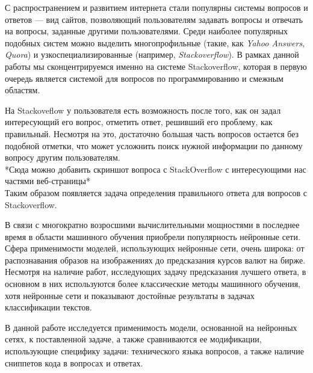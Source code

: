 \documentclass[../diploma.tex]{subfiles}
\begin{document}
        
    \label{sections/introduction}
    
    С распространением и развитием интернета стали популярны системы вопросов и ответов --- вид сайтов, 
    позволяющий пользователям задавать вопросы и отвечать на вопросы, заданные другими пользователями.
    Среди наиболее популярных подобных систем можно выделить многопрофильные (такие, как \textit{Yahoo Answers}, \textit{Quora}) 
    и узкоспециализированные (например, \textit{Stackoverflow}).
    В рамках данной работы мы сконцентрируемся именно на системе Stackoverflow, 
    которая в первую очередь является системой для вопросов по программированию и смежным областям.

    На Stackoveflow у пользователя есть возможность после того, как он задал интересующий его вопрос, отметить ответ, решивший его проблему, как правильный.
    Несмотря на это, достаточно большая часть вопросов остается без подобной отметки, что может усложнить поиск нужной информации по данному вопросу другим пользователям. \\

    *Сюда можно добавить скриншот вопроса с StackOverflow с интересующими нас частями веб-страницы*\\

    Таким образом появляется задача определения правильного ответа для вопросов с Stackoverflow.

    В связи с многократно возросшими вычислительными мощностями в последнее время в области машинного обучения приобрели популярность нейронные сети.
    Сфера применимости моделей, использующих нейронные сети, очень широка: от распознавания образов на изображениях до предсказания курсов валют на бирже.
    Несмотря на наличие работ, исследующих задачу предсказания лучшего ответа, в основном в них используются более классические методы машинного обучения,
    хотя нейронные сети и показывают достойные результаты в задачах классификации текстов.

    В данной работе исследуется применимость модели, основанной на нейронных сетях, к поставленной задаче, 
    а также сравниваются ее модификации, использующие специфику задачи: технического языка вопросов, а также наличие сниппетов кода в вопросах и ответах.
\end{document}
